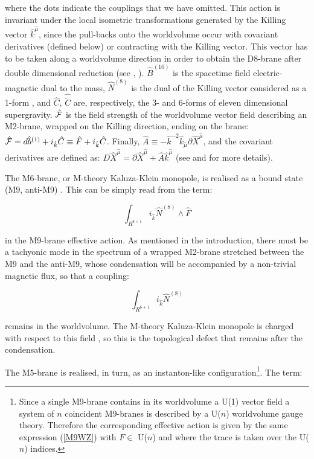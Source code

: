 \documentclass[12pt,a4paper]{article}
\begin{document}
\noindent where the dots indicate the couplings that we have omitted.
This action is invariant under the local isometric
transformations generated by the Killing vector ${\hat k}^{\hat \mu}$,
since the pull-backs onto the worldvolume occur with covariant
derivatives (defined below) or contracting with the Killing vector.
This vector has to be taken along a worldvolume direction in order to
obtain the D8-brane after double dimensional reduction
(see \cite{BvdS}, \cite{EL1}). ${\hat B}^{(10)}$ is the spacetime field
electric-magnetic dual to the
mass, ${\hat N}^{(8)}$ is the dual of the Killing vector considered
as a 1-form \cite{BEL}, 
and ${\hat C}$, ${\hat {\tilde C}}$ are, respectively,
the 3- and 6-forms of eleven dimensional supergravity. ${\hat {\cal F}}$ 
is the field strength of the worldvolume vector field describing 
an M2-brane, wrapped on the Killing direction, 
ending on the brane: ${\hat {\cal F}}=d{\hat b}^{(1)}+i_{\hat k}{\hat C}
\equiv {\hat F}+i_{\hat k}{\hat C}$. Finally,
${\hat A}\equiv -{\hat k}^{-2}{\hat k}_{\hat \mu}\partial
{\hat X}^{\hat \mu}$, and the covariant derivatives are defined as:
$D{\hat X}^{\hat \mu}=\partial {\hat X}^{\hat \mu}+{\hat A}
{\hat k}^{\hat \mu}$ (see \cite{Sato} 
and \cite{BJO,BEL} for more details).

The M6-brane, or M-theory Kaluza-Klein monopole, is realised as a 
bound state (M9, anti-M9) \cite{HL1}. 
This can be simply read from the term:

\begin{equation}
\int_{R^{8+1}} i_{\hat k}{\hat N}^{(8)}\wedge {\hat F}
\end{equation}

\noindent in the M9-brane effective action. As mentioned in the
introduction, there must be a tachyonic mode in the spectrum of a 
wrapped M2-brane stretched between the M9 and the anti-M9,
whose condensation will be accompanied by a 
non-trivial magnetic flux, so that a coupling:

\begin{equation}
\int_{R^{6+1}} i_{\hat k}{\hat N}^{(8)}
\end{equation}

\noindent remains in the worldvolume. 
The M-theory Kaluza-Klein monopole is charged with
respect to this field \cite{BEL}, 
so this is the topological defect that remains
after the condensation.

The M5-brane is realised, in turn, as an instanton-like 
configuration\footnote{Since a single M9-brane contains in
its worldvolume a U(1) vector field a system of $n$ coincident
M9-branes is described by a U($n$) worldvolume gauge theory.
Therefore the corresponding effective action is given by the 
same expression (\ref{M9WZ}) with $F\in$ U($n$) and where the trace is
taken over the U($n$) indices.}.
The term:
\end{document}
